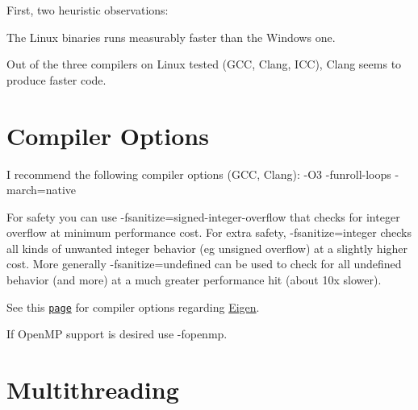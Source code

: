 First, two heuristic observations\+:


\begin{DoxyItemize}
\item The Linux binaries runs measurably faster than the Windows one.
\item Out of the three compilers on Linux tested (G\+CC, Clang, I\+CC), Clang seems to produce faster code.
\end{DoxyItemize}\hypertarget{perf_compoptions}{}\section{Compiler Options}\label{perf_compoptions}

\begin{DoxyItemize}
\item I recommend the following compiler options (G\+CC, Clang)\+: {\ttfamily -\/\+O3 -\/funroll-\/loops -\/march=native }
\item For safety you can use -\/fsanitize=signed-\/integer-\/overflow that checks for integer overflow at minimum performance cost. For extra safety, -\/fsanitize=integer checks all kinds of unwanted integer behavior (eg unsigned overflow) at a slightly higher cost. More generally -\/fsanitize=undefined can be used to check for all undefined behavior (and more) at a much greater performance hit (about 10x slower).
\item See this \href{ http://eigen.tuxfamily.org/index.php?title=Main_Page#Compiler_support}{\tt page} for compiler options regarding \hyperlink{namespaceEigen}{Eigen}.
\item If Open\+MP support is desired use {\ttfamily -\/fopenmp}.
\end{DoxyItemize}\hypertarget{perf_thread}{}\section{Multithreading}\label{perf_thread}

